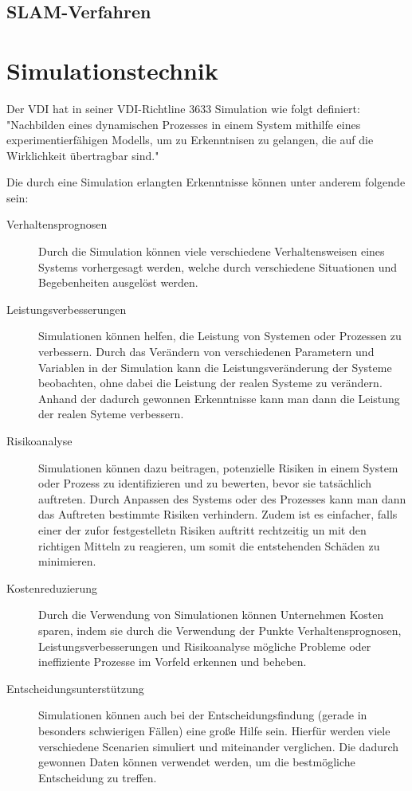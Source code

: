 \subsection{SLAM-Verfahren}




\section{Simulationstechnik} \label{simulationstechnik:section}
Der \ac{VDI} hat in seiner \ac{VDI}-Richtline 3633 Simulation wie folgt definiert: "Nachbilden eines dynamischen Prozesses in einem System mithilfe eines experimentierfähigen Modells, um zu Erkenntnisen zu gelangen, die auf die Wirklichkeit übertragbar sind." \cite{VDI-3633}


Die durch eine Simulation erlangten Erkenntnisse können unter anderem folgende sein:
\begin{description}
    \item[Verhaltensprognosen] Durch die Simulation können viele verschiedene Verhaltensweisen eines Systems vorhergesagt werden, welche durch verschiedene Situationen und Begebenheiten ausgelöst werden.
    
    \item[Leistungsverbesserungen] Simulationen können helfen, die Leistung von Systemen oder Prozessen zu verbessern. Durch das Verändern von verschiedenen Parametern und Variablen in der Simulation kann die Leistungsveränderung der Systeme beobachten, ohne dabei die Leistung der realen Systeme zu verändern. Anhand der dadurch gewonnen Erkenntnisse kann man dann die Leistung der realen Syteme verbessern.
    
    \item[Risikoanalyse] Simulationen können dazu beitragen, potenzielle Risiken in einem System oder Prozess zu identifizieren und zu bewerten, bevor sie tatsächlich auftreten. Durch Anpassen des Systems oder des Prozesses kann man dann das Auftreten bestimmte Risiken verhindern. Zudem ist es einfacher, falls einer der zufor festgestelletn Risiken auftritt rechtzeitig un mit den richtigen Mitteln zu reagieren, um somit die entstehenden Schäden zu minimieren.
    
    \item[Kostenreduzierung] Durch die Verwendung von Simulationen können Unternehmen Kosten sparen, indem sie durch die Verwendung der Punkte Verhaltensprognosen, Leistungsverbesserungen und Risikoanalyse mögliche Probleme oder ineffiziente Prozesse im Vorfeld erkennen und beheben.
    
    \item[Entscheidungsunterstützung] Simulationen können auch bei der Entscheidungsfindung (gerade in besonders schwierigen Fällen) eine große Hilfe sein. Hierfür werden viele verschiedene Scenarien simuliert und miteinander verglichen. Die dadurch gewonnen Daten können verwendet werden, um die bestmögliche Entscheidung zu treffen.
\end{description}


